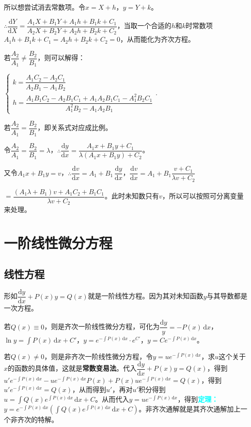 \documentclass[UTF8, 12pt]{ctexart}
\begin{document}
所以想尝试消去常数项。令$x=X+h$，$y=Y+k$。\medskip

$\therefore\dfrac{\textrm{d}Y}{\textrm{d}X}=\dfrac{A_1X+B_1Y+A_1h+B_1k+C_1}{A_2X+B_2Y+A_2h+B_2k+C_2}$，当取一个合适的$h$和$k$时常数项$A_1h+B_1k+C_1=A_2h+B_2k+C_2=0$，从而能化为齐次方程。

若$\dfrac{A_2}{A_1}\neq\dfrac{B_2}{B_1}$，则可以解得：\medskip

$\left\{\begin{array}{l}
    k=\dfrac{A_1C_2-A_2C_1}{A_2B_1-A_1B_2} \\  
    h=\dfrac{A_1B_1C_2-A_2B_1C_1+A_1A_2B_1C_1-A_1^2B_2C_1}{A_1^2B_2-A_1A_2B_1}
\end{array}
\right.$.

若$\dfrac{A_2}{A_1}=\dfrac{B_2}{B_1}$，即关系式对应成比例。

令$\dfrac{A_2}{A_1}=\dfrac{B_2}{B_1}=\lambda$，$\therefore\dfrac{\textrm{d}y}{\textrm{d}x}=\dfrac{A_1x+B_1y+C_1}{\lambda(A_1x+B_1y)+C_2}$。

又令$A_1x+B_1y=v$，$\therefore\dfrac{\textrm{d}v}{\textrm{d}x}=A_1+B_1\,\dfrac{\textrm{d}y}{\textrm{d}x}$，$\dfrac{\textrm{d}v}{\textrm{d}x}=A_1+B_1\dfrac{v+C_1}{\lambda v+C_2}$

$=\dfrac{(A_1\lambda+B_1)v+A_1C_2+B_1C_1}{\lambda v+C_2}$。此时未知数只有$v$，所以可以按照可分离变量来处理。

\section{一阶线性微分方程}

\subsection{线性方程}

形如$\dfrac{\textrm{d}y}{\textrm{d}x}+P(x)y=Q(x)$就是一阶线性方程。因为其对未知函数$y$与其导数都是一次方程。

若$Q(x)\equiv 0$，则是齐次一阶线性微分方程，可化为$\dfrac{\textrm{d}y}{y}=-P(x)\,\textrm{d}x$，$\ln y=\int P(x)\,\textrm{d}x+C'$，$y=e^{-\int P(x)\,\textrm{d}x}\cdot e^{C'}$，$y=Ce^{-\int P(x)\,\textrm{d}x}$。

若$Q(x)\neq 0$，则是非齐次一阶线性微分方程，令$y=ue^{-\int P(x)\,\textrm{d}x}$，求$u$这个关于$x$的函数的具体值，这就是\textbf{常数变易法}。代入$\dfrac{\textrm{d}y}{\textrm{d}x}+P(x)y=Q(x)$，得到$u'e^{-\int P(x)\,\textrm{d}x}-ue^{-\int P(x)\,\textrm{d}x}P(x)+P(x)ue^{-\int P(x)\,\textrm{d}x}=Q(x)$，得到$u'e^{-\int P(x)\,\textrm{d}x}=Q(x)$，从而得到$u'$，再对$u'$积分得到$u=\displaystyle{\int Q(x)e^{\int P(x)\,\textrm{d}x}\,\textrm{d}x}+C$。从而代入$y=ue^{-\int P(x)\,\textrm{d}x}$，得到\textcolor{aqua}{\textbf{定理：}}$y=e^{-\int P(x)\,\textrm{d}x}\left(\displaystyle{\int Q(x)e^{\int P(x)\,\textrm{d}x}\,\textrm{d}x}+C\right)$。非齐次通解就是其齐次通解加上一个非齐次的特解。
\end{document}
